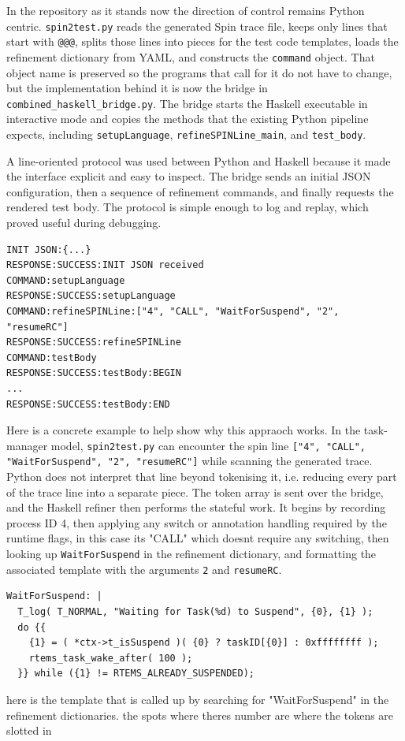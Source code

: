 In the repository as it stands now the direction of control remains Python centric.
\texttt{spin2test.py} reads the generated Spin trace file, keeps only lines
that start with \texttt{@@@}, splits those lines into pieces for the test code templates, loads the
refinement dictionary from YAML, and constructs the 
\texttt{command} object. That object name is preserved so the programs that call for it do not have to change, but the implementation behind it is now the
bridge in \texttt{combined\_haskell\_bridge.py}. The bridge starts the
Haskell executable in interactive mode and copies the methods that
the existing Python pipeline expects, including
\texttt{setupLanguage}, \texttt{refineSPINLine\_main}, and
\texttt{test\_body}.

A line-oriented protocol was used between Python and Haskell because it made the interface explicit and easy to inspect. The bridge sends an initial JSON configuration, then a sequence of refinement commands, and finally requests the rendered test body. The protocol is simple enough to log and replay, which proved useful during debugging.

\begin{lstlisting}[caption={Simplified bridge exchange between Python and Haskell}, label={lst:bridge-protocol}]
INIT JSON:{...}
RESPONSE:SUCCESS:INIT JSON received
COMMAND:setupLanguage
RESPONSE:SUCCESS:setupLanguage
COMMAND:refineSPINLine:["4", "CALL", "WaitForSuspend", "2", "resumeRC"]
RESPONSE:SUCCESS:refineSPINLine
COMMAND:testBody
RESPONSE:SUCCESS:testBody:BEGIN
...
RESPONSE:SUCCESS:testBody:END
\end{lstlisting}

Here is a concrete example to help  show why this appraoch works. In the
task-manager model, \texttt{spin2test.py} can encounter the spin 
line \texttt{["4", "CALL", "WaitForSuspend", "2", "resumeRC"]}
while scanning the generated trace. Python does not interpret that
line beyond tokenising it, i.e. reducing every part of the trace line into a separate piece. The token array is sent over the
bridge, and the Haskell refiner then performs the stateful work. It begins by
recording process ID 4, then applying any switch or annotation handling
required by the runtime flags, in this case its "CALL" which doesnt require any switching, then looking up \texttt{WaitForSuspend} in
the refinement dictionary, and formatting the associated template with
the arguments \texttt{2} and \texttt{resumeRC}. 

\begin{lstlisting}[language={}, caption={Refinement template for \texttt{WaitForSuspend}}, label={lst:waitforsuspend-template}]
WaitForSuspend: |
  T_log( T_NORMAL, "Waiting for Task(%d) to Suspend", {0}, {1} );
  do {{
    {1} = ( *ctx->t_isSuspend )( {0} ? taskID[{0}] : 0xffffffff );
    rtems_task_wake_after( 100 );
  }} while ({1} != RTEMS_ALREADY_SUSPENDED);
\end{lstlisting}
here is the template that is called up by searching for "WaitForSuspend" in the refinement dictionaries. the spots where theres {number} are where the tokens are slotted in

